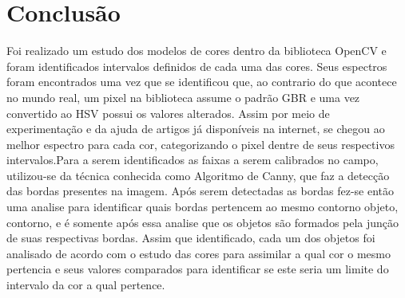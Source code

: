 
\chapter{Conclusão} \label{Cap:Conclusao}


	Foi realizado um estudo dos modelos de cores dentro da biblioteca OpenCV e foram identificados intervalos definidos de cada uma das cores. Seus espectros foram encontrados uma vez que se identificou que, ao contrario do que acontece no mundo real, um pixel na biblioteca assume o  padrão GBR e uma vez convertido ao HSV possui os valores alterados. Assim por meio de experimentação e da ajuda de artigos já disponíveis na internet, se chegou ao melhor espectro para cada cor, categorizando o pixel dentre de seus respectivos intervalos.Para a serem identificados as faixas a serem calibrados no campo, utilizou-se da técnica conhecida como Algoritmo de Canny, que faz a detecção das bordas presentes na imagem. Após serem detectadas as bordas fez-se então uma analise para identificar quais bordas pertencem ao mesmo contorno objeto, contorno, e é somente após essa analise que os objetos são formados pela junção de suas respectivas bordas. Assim que identificado, cada um dos objetos foi analisado de acordo com o estudo das cores para assimilar a qual cor o mesmo pertencia e seus valores comparados para identificar se este seria um limite do intervalo da cor a qual pertence.

